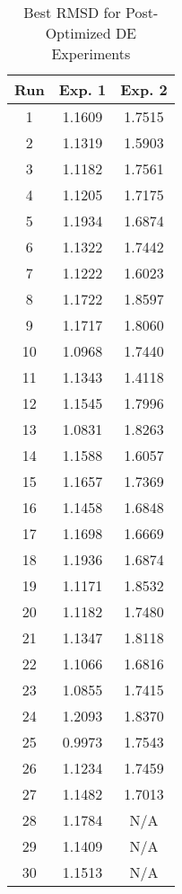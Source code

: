 \begin{table}
	\centering
	\begin{tabular}{ | c | c | c | }
		\hline
		Run & Exp. 1 & Exp. 2 \\ \hline
		1 & 1.1609 & 1.7515 \\ \hline
		2 & 1.1319 & 1.5903 \\ \hline
		3 & 1.1182 & 1.7561 \\ \hline
		4 & 1.1205 & 1.7175 \\ \hline
		5 & 1.1934 & 1.6874 \\ \hline
		6 & 1.1322 & 1.7442 \\ \hline
		7 & 1.1222 & 1.6023 \\ \hline
		8 & 1.1722 & 1.8597 \\ \hline
		9 & 1.1717 & 1.8060 \\ \hline
		10 & 1.0968 & 1.7440 \\ \hline
		11 & 1.1343 & 1.4118 \\ \hline
		12 & 1.1545 & 1.7996 \\ \hline
		13 & 1.0831 & 1.8263 \\ \hline
		14 & 1.1588 & 1.6057 \\ \hline
		15 & 1.1657 & 1.7369 \\ \hline
		16 & 1.1458 & 1.6848 \\ \hline
		17 & 1.1698 & 1.6669 \\ \hline
		18 & 1.1936 & 1.6874 \\ \hline
		19 & 1.1171 & 1.8532 \\ \hline
		20 & 1.1182 & 1.7480 \\ \hline
		21 & 1.1347 & 1.8118 \\ \hline
		22 & 1.1066 & 1.6816 \\ \hline
		23 & 1.0855 & 1.7415 \\ \hline
		24 & 1.2093 & 1.8370 \\ \hline
		25 & 0.9973 & 1.7543 \\ \hline
		26 & 1.1234 & 1.7459 \\ \hline
		27 & 1.1482 & 1.7013 \\ \hline
		28 & 1.1784 & N/A \\ \hline
		29 & 1.1409 & N/A \\ \hline
		30 & 1.1513 & N/A \\ \hline
	\end{tabular}
	\caption{Best RMSD for Post-Optimized DE Experiments}
\end{table}

